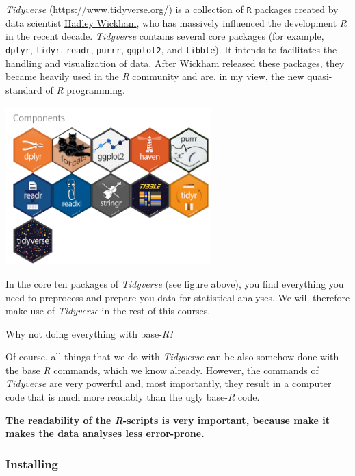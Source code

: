 \documentclass[
]{scrartcl}
\makeatletter
\newenvironment{kframe}{%
\medskip{}
\setlength{\fboxsep}{.8em}
 \def\at@end@of@kframe{}%
 \ifinner\ifhmode%
  \def\at@end@of@kframe{\end{minipage}}%
  \begin{minipage}{\columnwidth}%
 \fi\fi%
 \def\FrameCommand##1{\hskip\@totalleftmargin \hskip-\fboxsep
 \colorbox{shadecolor}{##1}\hskip-\fboxsep
     \hskip-\linewidth \hskip-\@totalleftmargin \hskip\columnwidth}%
 \MakeFramed {\advance\hsize-\width
   \@totalleftmargin\z@ \linewidth\hsize
   \@setminipage}}%
 {\par\unskip\endMakeFramed%
 \at@end@of@kframe}
\newenvironment{rmdblock}[1]
  {
  \begin{itemize}
  \renewcommand{\labelitemi}{
    \raisebox{-.7\height}[0pt][0pt]{
      {\setkeys{Gin}{width=3em,keepaspectratio}\texttt{[image: images/\#1]}}
    }
  }
  \setlength{\fboxsep}{1em}
  \begin{kframe}
  \item
  }
  {
  \end{kframe}
  \end{itemize}
  }
\newenvironment{important}
    {\begin{rmdblock}{hint}}
    {\end{rmdblock}}
\makeatother
\begin{document}
\emph{Tidyverse} (\url{https://www.tidyverse.org/}) is a collection of \texttt{R} packages created by data scientist \href{http://hadley.nz/}{Hadley Wickham}, who has massively influenced the development \emph{R} in the recent decade. \emph{Tidyverse} contains several core packages (for example, \texttt{dplyr}, \texttt{tidyr}, \texttt{readr}, \texttt{purrr}, \texttt{ggplot2}, and \texttt{tibble}). It intends to facilitates the handling and visualization of data. After Wickham released these packages, they became heavily used in the \emph{R} community and are, in my view, the new quasi-standard of \emph{R} programming.

\begin{center}\includegraphics[width=300px]{images/tidyverse_components} \end{center}

In the core ten packages of \emph{Tidyverse} (see figure above), you find everything you need to preprocess and prepare you data for statistical analyses. We will therefore make use of \emph{Tidyverse} in the rest of this courses.

\begin{important}
Why not doing everything with base-\emph{R}?

Of course, all things that we do with \emph{Tidyverse} can be also
somehow done with the base \emph{R} commands, which we know already.
However, the commands of \emph{Tidyverse} are very powerful and, most
importantly, they result in a computer code that is much more readably
than the ugly base-\emph{R} code.

\textbf{The readability of the \emph{R}-scripts is very important,
because make it makes the data analyses less error-prone.}
\end{important}

\hypertarget{installing}{%
\subsubsection*{Installing}\label{installing}}
\end{document}
